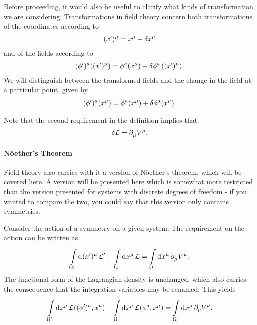 Before proceeding, it would also be useful to clarify what kinds of transformation we are considering. Transformations in field theory concern both transformations of the coordinates according to
\begin{align*}
	(x^{\prime})^{\mu} = x^{\mu} + \var{x^{\mu}}
\end{align*}
and of the fields according to
\begin{align*}
	(\phi^{\prime})^{a}((x^{\prime})^{\mu}) = \phi^{a}(x^{\mu}) + \var{\phi^{a}}((x^{\prime})^{\mu}).
\end{align*}
We will distinguish between the transformed fields and the change in the field at a particular point, given by
\begin{align*}
	(\phi^{\prime})^{a}(x^{\mu}) = \phi^{a}(x^{\mu}) + \bar{\delta}\phi^{a}(x^{\mu}).
\end{align*}

Note that the second requirement in the definition implies that
\begin{align*}
	\var{\ensuremath{\mathcal{L}}} = \partial^{}_{\mu}V^{\mu}.
\end{align*}

\paragraph{Nöether's Theorem}
Field theory also carries with it a version of Nöether's theorem, which will be covered here. A version will be presented here which is somewhat more restricted than the version presented for systems with discrete degrees of freedom - if you wanted to compare the two, you could say that this version only contains symmetries.

Consider the action of a symmetry on a given system. The requirement on the action can be written as
\begin{align*}
	\int\limits_{\Omega^{\prime}}^{}\dd[]{(x^{\prime})^{\mu}}\mathcal{L}^{\prime} - \int\limits_{\Omega}^{}\dd[]{x^{\mu}}\mathcal{L} = \int\limits_{\Omega}^{}\dd[]{x^{\mu}}\partial^{}_{\mu}V^{\mu}.
\end{align*}
The functional form of the Lagrangian density is unchanged, which also carries the consequence that the integration variables may be renamed. This yields
\begin{align*}
	\int\limits_{\Omega^{\prime}}^{}\dd[]{x^{\mu}}\mathcal{L}((\phi^{\prime})^{a}, x^{\mu}) - \int\limits_{\Omega}^{}\dd[]{x^{\mu}}\mathcal{L}(\phi^{a}, x^{\mu}) = \int\limits_{\Omega}^{}\dd[]{x^{\mu}}\partial^{}_{\nu}V^{\nu}.
\end{align*}

